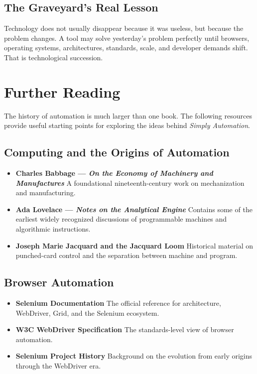 \documentclass[11pt,twoside]{book}
\begin{document}
\section*{The Graveyard's Real Lesson}
Technology does not usually disappear because it was useless, but because the problem changes. A tool may solve yesterday's problem perfectly until browsers, operating systems, architectures, standards, scale, and developer demands shift. That is technological succession.


\chapter{Further Reading}
\label{app:reading}

The history of automation is much larger than one book.
The following resources provide useful starting points for exploring the ideas behind \textit{Simply Automation}.

\section*{Computing and the Origins of Automation}
\begin{itemize}[nosep]
    \item \textbf{Charles Babbage — \textit{On the Economy of Machinery and Manufactures}} A foundational nineteenth-century work on mechanization and manufacturing.
    \item \textbf{Ada Lovelace — \textit{Notes on the Analytical Engine}} Contains some of the earliest widely recognized discussions of programmable machines and algorithmic instructions.
    \item \textbf{Joseph Marie Jacquard and the Jacquard Loom} Historical material on punched-card control and the separation between machine and program.
\end{itemize}

\section*{Browser Automation}
\begin{itemize}[nosep]
    \item \textbf{Selenium Documentation} The official reference for architecture, WebDriver, Grid, and the Selenium ecosystem.
    \item \textbf{W3C WebDriver Specification} The standards-level view of browser automation.
    \item \textbf{Selenium Project History} Background on the evolution from early origins through the WebDriver era.
\end{itemize}
\end{document}
